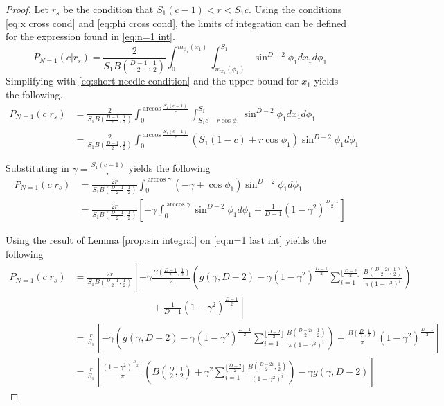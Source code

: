 \documentclass{article}
\begin{document}
\begin{proof}
	Let $r_s$ be the condition that $S_1(c-1)<r<S_1c$. Using the conditions \ref{eq:x cross cond} and \ref{eq:phi cross cond}, 
	the limits of integration can be defined for the expression found in \ref{eq:n=1 int}.
	\begin{equation}
		P_{N=1}(c|r_s) = \frac{2}{S_1B(\frac{D-1}{2}, \frac{1}{2})} \int_0^{m_{\phi_1}(x_1)}\int_{m_{x_1}(\phi_1)}^{S_1}\sin^{D-2}\phi_1 dx_1 d\phi_1 
	\end{equation}
	Simplifying with \ref{eq:short needle condition} and the upper bound for $x_1$ yields the following.
	\begin{align}
		P_{N=1}(c|r_s) &= \frac{2}{S_1B(\frac{D-1}{2}, \frac{1}{2})} \int_0^{\arccos\frac{S_1(c-1)}{r}}\int_{S_1c-r\cos\phi_1}^{S_1}\sin^{D-2}\phi_1 dx_1 d\phi_1 \\
		&= \frac{2}{S_1B(\frac{D-1}{2}, \frac{1}{2})} \int_0^{\arccos\frac{S_1(c-1)}{r}} (S_1(1-c) + r\cos\phi_1)\sin^{D-2}\phi_1 d\phi_1
	\end{align}

	Substituting in $\gamma = \frac{S_1(c-1)}{r}$ yields the following
	\begin{align}
		P_{N=1}(c|r_s) &= \frac{2r}{S_1B(\frac{D-1}{2}, \frac{1}{2})} \int_0^{\arccos\gamma} (-\gamma + \cos\phi_1)\sin^{D-2}\phi_1 d\phi_1 \\
		&= \frac{2r}{S_1B(\frac{D-1}{2}, \frac{1}{2})} \left[-\gamma\int_0^{\arccos\gamma} \sin^{D-2}\phi_1d\phi_1 + \frac{1}{D-1}(1-\gamma^2)^{\frac{D-1}{2}} \right] \label{eq:n=1 last int}
	\end{align}

	Using the result of Lemma \ref{prop:sin integral} on \ref{eq:n=1 last int} yields the following
	\begin{align}
		P_{N=1}(c|r_s) &= \frac{2r}{S_1B(\frac{D-1}{2}, \frac{1}{2})} \left[-\gamma\frac{B(\frac{D-1}{2}, \frac{1}{2})}{2}\left(g(\gamma, D-2)-\gamma(1-\gamma^2)^{\frac{D-1}{2}} \sum_{i=1}^{\lfloor \frac{D-2}{2} \rfloor}\frac{B(\frac{D-2i}{2}, \frac{1}{2})}{\pi(1-\gamma^2)^i}\right) \right.\nonumber\\ 
			& \left. \quad \quad \quad \quad \quad \quad \quad \quad+ \frac{1}{D-1}(1-\gamma^2)^\frac{D-1}{2} \right] \\
		&= \frac{r}{S_1} \left[-\gamma\left(g(\gamma, D-2) - \gamma(1-\gamma^2)^{\frac{D-1}{2}} \sum_{i=1}^{\lfloor \frac{D-2}{2} \rfloor}\frac{B(\frac{D-2i}{2}, \frac{1}{2})}{\pi(1-\gamma^2)^i}\right) + \frac{B(\frac{D}{2}, \frac{1}{2})}{\pi}(1-\gamma^2)^\frac{D-1}{2} \right] \\
		&= \frac{r}{S_1} \left[\frac{(1-\gamma^2)^{\frac{D-1}{2}}}{\pi} \left(B\left(\frac{D}{2}, \frac{1}{2} \right) + \gamma^2 \sum_{i=1}^{\lfloor \frac{D-2}{2} \rfloor}\frac{B(\frac{D-2i}{2}, \frac{1}{2})}{(1-\gamma^2)^i}\right) - \gamma g(\gamma, D-2) \right] \label{eq:n=1 final sol}
	\end{align}
\end{proof}
\end{document}

